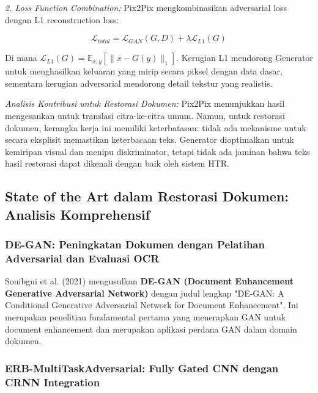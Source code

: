\documentclass[12pt,a4paper]{article}
\begin{document}
\textit{2. Loss Function Combination:} Pix2Pix mengkombinasikan adversarial loss dengan L1 reconstruction loss:

\begin{equation}
\mathcal{L}_{total} = \mathcal{L}_{GAN}(G, D) + \lambda \mathcal{L}_{L1}(G)
\end{equation}

Di mana $\mathcal{L}_{L1}(G) = \mathbb{E}_{x, y}[\|x - G(y)\|_1]$. Kerugian L1 mendorong Generator untuk menghasilkan keluaran yang mirip secara piksel dengan data dasar, sementara kerugian adversarial mendorong detail tekstur yang realistis.

\textit{Analisis Kontribusi untuk Restorasi Dokumen:} Pix2Pix menunjukkan hasil mengesankan untuk translasi citra-ke-citra umum. Namun, untuk restorasi dokumen, kerangka kerja ini memiliki keterbatasan: tidak ada mekanisme untuk secara eksplisit memastikan keterbacaan teks. Generator dioptimalkan untuk kemiripan visual dan menipu diskriminator, tetapi tidak ada jaminan bahwa teks hasil restorasi dapat dikenali dengan baik oleh sistem HTR.

\subsection{State of the Art dalam Restorasi Dokumen: Analisis Komprehensif}
\label{subsec:sota-analysis}

\vspace{1.5ex}

\subsubsection{DE-GAN: Peningkatan Dokumen dengan Pelatihan Adversarial dan Evaluasi OCR}
\label{subsubsec:de-gan}

\vspace{1.5ex}

Souibgui et al. (2021) mengusulkan \textbf{DE-GAN (Document Enhancement Generative Adversarial Network)} dengan judul lengkap "DE-GAN: A Conditional Generative Adversarial Network for Document Enhancement". Ini merupakan penelitian fundamental pertama yang menerapkan GAN untuk document enhancement dan merupakan aplikasi perdana GAN dalam domain dokumen.

\subsubsection{ERB-MultiTaskAdversarial: Fully Gated CNN dengan CRNN Integration}
\label{subsubsec:erb-multitask}
\end{document}
